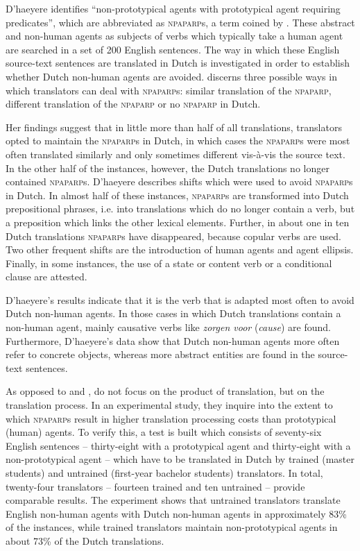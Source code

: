 \documentclass[output=paper]{LSP/langsci}
\begin{document}
D’haeyere identifies “non-prototypical agents with prototypical agent requiring predicates”, which are abbreviated as \textsc{npaparp}s, a term coined by \citet{Vandepitte2010}. These abstract and non-human agents as subjects of verbs which typically take a human agent are searched in a set of 200 English sentences. The way in which these English source-text sentences are translated in Dutch is investigated in order to establish whether Dutch non-human agents are avoided. \citet{Dhaeyere2010} discerns three possible ways in which translators can deal with \textsc{npaparp}s: similar translation of the \textsc{npaparp}, different translation of the \textsc{npaparp} or no \textsc{npaparp} in Dutch.  

Her findings suggest that in little more than half of all translations, translators opted to maintain the \textsc{npaparp}s in Dutch, in which cases the \textsc{npaparp}s were most often translated similarly and only sometimes different vis-à-vis the source text. In the other half of the instances, however, the Dutch translations no longer contained \textsc{npaparp}s. D’haeyere describes shifts which were used to avoid \textsc{npaparp}s in Dutch. In almost half of these instances, \textsc{npaparp}s are transformed into Dutch prepositional phrases, i.e. into translations which do no longer contain a verb, but a preposition which links the other lexical elements. Further, in about one in ten Dutch translations \textsc{npaparp}s have disappeared, because copular verbs are used. Two other frequent shifts are the introduction of human agents and agent ellipsis. Finally, in some instances, the use of a state or content verb or a conditional clause are attested. 

D’haeyere’s results indicate that it is the verb that is adapted most often to avoid Dutch non-human agents. In those cases in which Dutch translations contain a non-human agent, mainly causative verbs like \textit{zorgen voor} (\textit{cause}) are found. Furthermore, D’haeyere’s data show that Dutch non-human agents more often refer to concrete objects, whereas more abstract entities are found in the source-text sentences.       

As opposed to \citet{Vandepitte2007} and \citet{Dhaeyere2010}, \citet{Vandepitte2011} do not focus on the product of translation, but on the translation process. In an experimental study, they inquire into the extent to which \textsc{npaparp}s result in higher translation processing costs than prototypical (human) agents. To verify this, a test is built which consists of seventy-six English sentences – thirty-eight with a prototypical agent and thirty-eight with a non-prototypical agent – which have to be translated in Dutch by trained (master students) and untrained (first-year bachelor students) translators. In total, twenty-four translators – fourteen trained and ten untrained – provide comparable results. The experiment shows that untrained translators translate English non-human agents with Dutch non-human agents in approximately 83\% of the instances, while trained translators maintain non-prototypical agents in about 73\% of the Dutch translations. 
\end{document}
